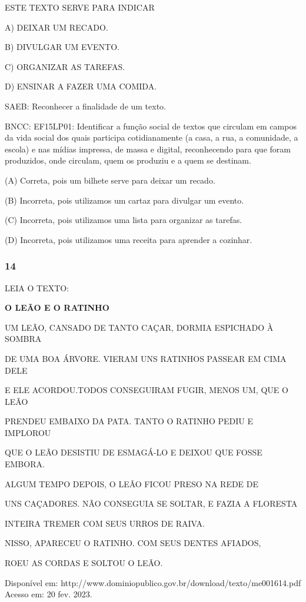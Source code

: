 ESTE TEXTO SERVE PARA INDICAR

A) DEIXAR UM RECADO.

B) DIVULGAR UM EVENTO.

C) ORGANIZAR AS TAREFAS.

D) ENSINAR A FAZER UMA COMIDA.

SAEB: Reconhecer a finalidade de um texto.

BNCC: EF15LP01: Identificar a função social de textos que
circulam em campos da vida social dos quais participa cotidianamente (a
casa, a rua, a comunidade, a escola) e nas mídias impressa, de massa e
digital, reconhecendo para que foram produzidos, onde circulam, quem os
produziu e a quem se destinam.

(A) Correta, pois um bilhete serve para deixar um recado.

(B) Incorreta, pois utilizamos um cartaz para divulgar um evento.

(C) Incorreta, pois utilizamos uma lista para organizar as tarefas.

(D) Incorreta, pois utilizamos uma receita para aprender a cozinhar.

\subsubsection{14}\label{section-54}

LEIA O TEXTO:

\textbf{O LEÃO E O RATINHO}

UM LEÃO, CANSADO DE TANTO CAÇAR, DORMIA ESPICHADO À SOMBRA

DE UMA BOA ÁRVORE. VIERAM UNS RATINHOS PASSEAR EM CIMA DELE

E ELE ACORDOU.TODOS CONSEGUIRAM FUGIR, MENOS UM, QUE O LEÃO

PRENDEU EMBAIXO DA PATA. TANTO O RATINHO PEDIU E IMPLOROU

QUE O LEÃO DESISTIU DE ESMAGÁ-LO E DEIXOU QUE FOSSE EMBORA.

ALGUM TEMPO DEPOIS, O LEÃO FICOU PRESO NA REDE DE

UNS CAÇADORES. NÃO CONSEGUIA SE SOLTAR, E FAZIA A FLORESTA

INTEIRA TREMER COM SEUS URROS DE RAIVA.

NISSO, APARECEU O RATINHO. COM SEUS DENTES AFIADOS,

ROEU AS CORDAS E SOLTOU O LEÃO.

Disponível
em: http://www.dominiopublico.gov.br/download/texto/me001614.pdf Acesso em: 
20 fev. 2023.

